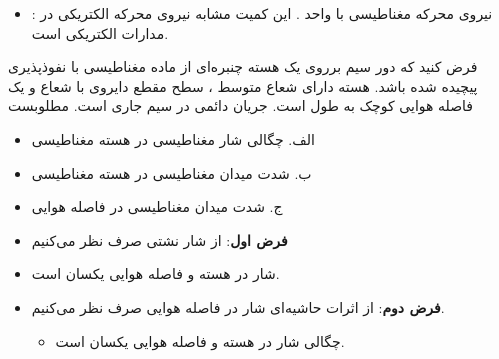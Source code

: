 \begin{ELjoin}

\begin{itemize}
\tightlist
\item
  : نیروی محرکه مغناطیسی با واحد . این کمیت مشابه نیروی محرکه الکتریکی در مدارات الکتریکی است.
\end{itemize}


\begin{ELexample}{}

فرض کنید که  دور سیم برروی یک هسته چنبره‌ای از ماده مغناطیسی با نفوذپذیری \ELim{\mu} پیچیده شده باشد. هسته دارای شعاع متوسط ، سطح مقطع دایروی با شعاع  و یک فاصله هوایی کوچک به طول  است. جریان دائمی  در سیم جاری است. مطلوبست

\begin{itemize}
\tightlist
\item
  الف. چگالی شار مغناطیسی در هسته مغناطیسی
\item
  ب. شدت میدان مغناطیسی در هسته مغناطیسی
\item
  ج. شدت میدان مغناطیسی در فاصله هوایی
\end{itemize}


\begin{ELsolution}

\begin{itemize}
\tightlist
\item
  \textbf{فرض اول}: از شار نشتی صرف نظر می‌کنیم
\end{itemize}



\begin{itemize}
\tightlist
\item
  شار در هسته و فاصله هوایی یکسان است.
\item
  \textbf{فرض دوم}: از اثرات حاشیه‌ای شار در فاصله هوایی صرف نظر می‌کنیم.

  \begin{itemize}
  \tightlist
  \item
    چگالی شار در هسته و فاصله هوایی یکسان است.
  \end{itemize}
\end{itemize}


\end{ELsolution}
\end{ELexample}
\end{ELjoin}

